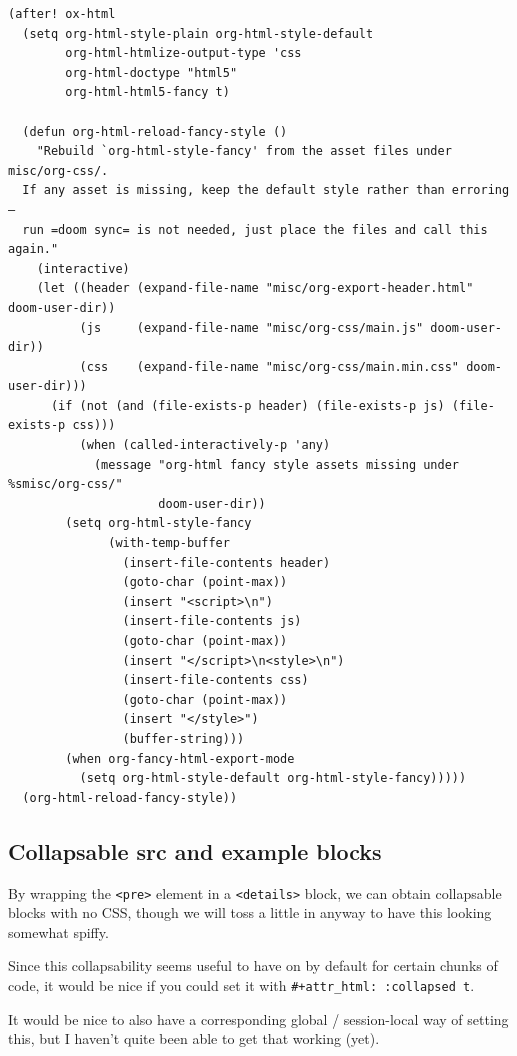 \documentclass[11pt]{article}
\begin{document}
\begin{verbatim}
(after! ox-html
  (setq org-html-style-plain org-html-style-default
        org-html-htmlize-output-type 'css
        org-html-doctype "html5"
        org-html-html5-fancy t)

  (defun org-html-reload-fancy-style ()
    "Rebuild `org-html-style-fancy' from the asset files under misc/org-css/.
  If any asset is missing, keep the default style rather than erroring —
  run =doom sync= is not needed, just place the files and call this again."
    (interactive)
    (let ((header (expand-file-name "misc/org-export-header.html" doom-user-dir))
          (js     (expand-file-name "misc/org-css/main.js" doom-user-dir))
          (css    (expand-file-name "misc/org-css/main.min.css" doom-user-dir)))
      (if (not (and (file-exists-p header) (file-exists-p js) (file-exists-p css)))
          (when (called-interactively-p 'any)
            (message "org-html fancy style assets missing under %smisc/org-css/"
                     doom-user-dir))
        (setq org-html-style-fancy
              (with-temp-buffer
                (insert-file-contents header)
                (goto-char (point-max))
                (insert "<script>\n")
                (insert-file-contents js)
                (goto-char (point-max))
                (insert "</script>\n<style>\n")
                (insert-file-contents css)
                (goto-char (point-max))
                (insert "</style>")
                (buffer-string)))
        (when org-fancy-html-export-mode
          (setq org-html-style-default org-html-style-fancy)))))
  (org-html-reload-fancy-style))
\end{verbatim}
\subsection{Collapsable src and example blocks}
\label{sec:orgf4a47c2}

By wrapping the \texttt{<pre>} element in a \texttt{<details>} block, we can obtain collapsable
blocks with no CSS, though we will toss a little in anyway to have this looking
somewhat spiffy.

Since this collapsability seems useful to have on by default for certain chunks
of code, it would be nice if you could set it with \texttt{\#+attr\_html: :collapsed t}.

It would be nice to also have a corresponding global / session-local way of
setting this, but I haven't quite been able to get that working (yet).
\end{document}
